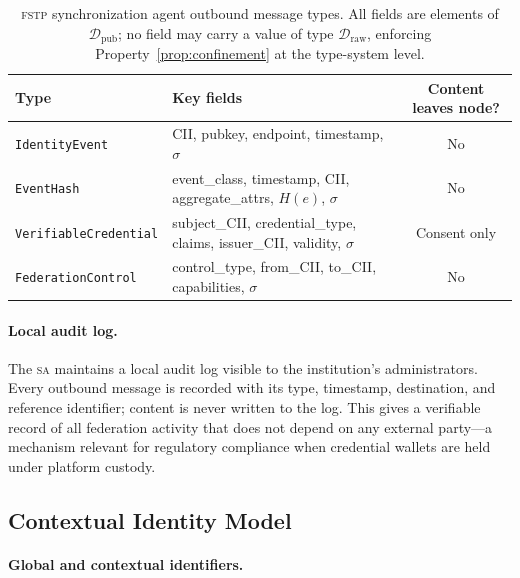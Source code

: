 \documentclass[12pt]{article}
\newcommand{\Draw}{\mathcal{D}_{\text{raw}}}
\newcommand{\Dpub}{\mathcal{D}_{\text{pub}}}
\newcommand{\SA}{\textsc{sa}}
\newcommand{\FSTP}{\textsc{fstp}}
\begin{document}
	\begin{table}[h]
		\centering
		\caption{\FSTP{} synchronization agent outbound message types.
			All fields are elements of $\Dpub$; no field may carry a value of
			type $\Draw$, enforcing Property~\ref{prop:confinement} at the
			type-system level.}
		\label{tab:messages}
		\small
		\begin{tabularx}{\linewidth}{@{} l X c @{}}
			\toprule
			\textbf{Type} & \textbf{Key fields} &
			\textbf{Content leaves node?} \\
			\midrule
			\texttt{IdentityEvent} &
			CII, pubkey, endpoint, timestamp, $\sigma$ & No \\
			\addlinespace[1ex]
			\texttt{EventHash} &
			event\_class, timestamp, CII, aggregate\_attrs, $H(e)$, $\sigma$
			& No \\
			\addlinespace[1ex]
			\texttt{VerifiableCredential} &
			subject\_CII, credential\_type, claims, issuer\_CII, validity,
			$\sigma$ & Consent only \\
			\addlinespace[1ex]
			\texttt{FederationControl} &
			control\_type, from\_CII, to\_CII, capabilities, $\sigma$ & No \\
			\bottomrule
		\end{tabularx}
	\end{table}
	
	\paragraph{Local audit log.}
	
	The \SA{} maintains a local audit log visible to the institution's
	administrators. Every outbound message is recorded with its type,
	timestamp, destination, and reference identifier; content is never
	written to the log. This gives a verifiable record of all federation
	activity that does not depend on any external party---a mechanism
	relevant for regulatory compliance when credential wallets are held
	under platform custody.
	
	\subsection{Contextual Identity Model}
	\label{sec:identity}
	
	\paragraph{Global and contextual identifiers.}
	
\end{document}
